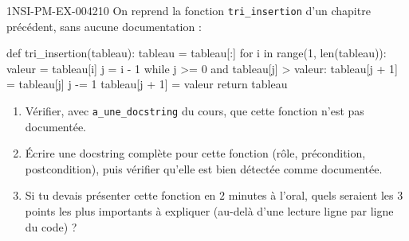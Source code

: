 %
\begin{exercice}{1NSI-PM-EX-004}{2}{10}
On reprend la fonction \lstinline{tri_insertion} d'un chapitre précédent, sans aucune
documentation :
\begin{python}
def tri_insertion(tableau):
    tableau = tableau[:]
    for i in range(1, len(tableau)):
        valeur = tableau[i]
        j = i - 1
        while j >= 0 and tableau[j] > valeur:
            tableau[j + 1] = tableau[j]
            j -= 1
        tableau[j + 1] = valeur
    return tableau
\end{python}
\begin{enumerate}
  \item Vérifier, avec \lstinline{a_une_docstring} du cours, que cette fonction n'est pas documentée.
  \item Écrire une docstring complète pour cette fonction (rôle, précondition, postcondition), puis vérifier qu'elle est bien détectée comme documentée.
  \item Si tu devais présenter cette fonction en $2$ minutes à l'oral, quels seraient les $3$ points les plus importants à expliquer (au-delà d'une lecture ligne par ligne du code) ?
\end{enumerate}
\end{exercice}
